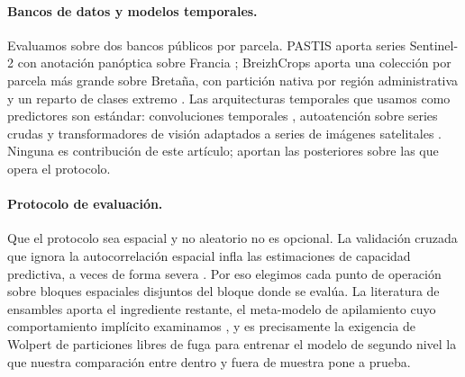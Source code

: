 \paragraph{Bancos de datos y modelos temporales.}
Evaluamos sobre dos bancos públicos por parcela. PASTIS aporta series Sentinel-2 con anotación
panóptica sobre Francia \cite{garnot2021pastis}; BreizhCrops aporta una colección por parcela más
grande sobre Bretaña, con partición nativa por región administrativa y un reparto de clases extremo
\cite{russwurm2020breizhcrops}. Las arquitecturas temporales que usamos como predictores son
estándar: convoluciones temporales \cite{pelletier2019tempcnn}, autoatención sobre series crudas
\cite{russwurm2020selfattention} y transformadores de visión adaptados a series de imágenes
satelitales \cite{tarasiou2023tsvit}. Ninguna es contribución de este artículo; aportan las
posteriores sobre las que opera el protocolo.

\paragraph{Protocolo de evaluación.}
Que el protocolo sea espacial y no aleatorio no es opcional. La validación cruzada que ignora la
autocorrelación espacial infla las estimaciones de capacidad predictiva, a veces de forma severa
\cite{roberts2017crossvalidation,ploton2020spatialvalidation}. Por eso elegimos cada punto de
operación sobre bloques espaciales disjuntos del bloque donde se evalúa. La literatura de ensambles
aporta el ingrediente restante, el meta-modelo de apilamiento cuyo comportamiento implícito
examinamos \cite{wolpert1992stacking,zhang2022ensemblereview,abdali2023parallelcascaded}, y es
precisamente la exigencia de Wolpert de particiones libres de fuga para entrenar el modelo de
segundo nivel la que nuestra comparación entre dentro y fuera de muestra pone a prueba.
